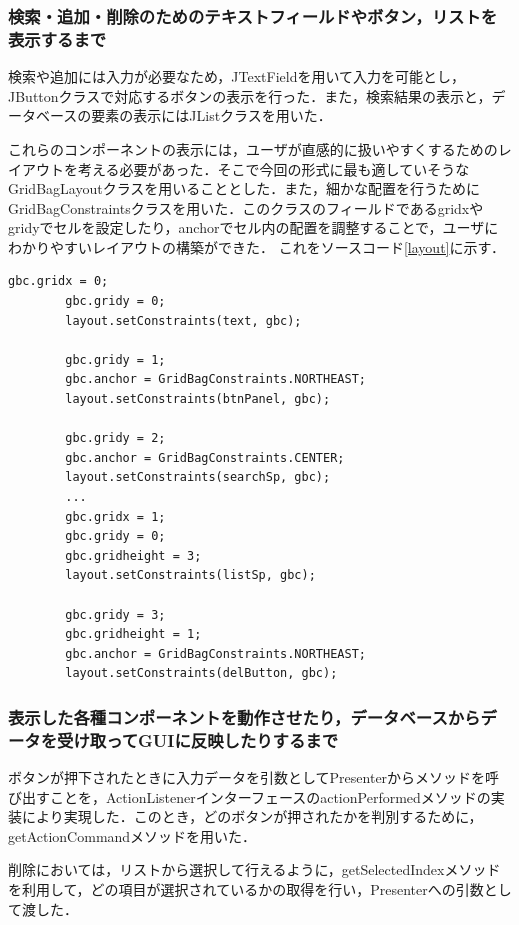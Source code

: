 \documentclass[12pt]{jarticle}
\begin{document}
\subsubsection{検索・追加・削除のためのテキストフィールドやボタン，リストを表示するまで}
検索や追加には入力が必要なため，JTextFieldを用いて入力を可能とし，JButtonクラスで対応するボタンの表示を行った．また，検索結果の表示と，データベースの要素の表示にはJListクラスを用いた．

これらのコンポーネントの表示には，ユーザが直感的に扱いやすくするためのレイアウトを考える必要があった．そこで今回の形式に最も適していそうなGridBagLayoutクラスを用いることとした．また，細かな配置を行うためにGridBagConstraintsクラスを用いた．このクラスのフィールドであるgridxやgridyでセルを設定したり，anchorでセル内の配置を調整することで，ユーザにわかりやすいレイアウトの構築ができた．
これをソースコード\ref{layout}に示す．

\begin{lstlisting}[caption=UnifyGUIコンストラクタの一部, label=layout]
        gbc.gridx = 0;
        gbc.gridy = 0;
        layout.setConstraints(text, gbc);

        gbc.gridy = 1;
        gbc.anchor = GridBagConstraints.NORTHEAST;
        layout.setConstraints(btnPanel, gbc);

        gbc.gridy = 2;
        gbc.anchor = GridBagConstraints.CENTER;
        layout.setConstraints(searchSp, gbc);
        ...
        gbc.gridx = 1;
        gbc.gridy = 0;
        gbc.gridheight = 3;
        layout.setConstraints(listSp, gbc);

        gbc.gridy = 3;
        gbc.gridheight = 1;
        gbc.anchor = GridBagConstraints.NORTHEAST;
        layout.setConstraints(delButton, gbc);
\end{lstlisting}

\subsubsection{表示した各種コンポーネントを動作させたり，データベースからデータを受け取ってGUIに反映したりするまで}
ボタンが押下されたときに入力データを引数としてPresenterからメソッドを呼び出すことを，ActionListenerインターフェースのactionPerformedメソッドの実装により実現した．このとき，どのボタンが押されたかを判別するために，getActionCommandメソッドを用いた．

削除においては，リストから選択して行えるように，getSelectedIndexメソッドを利用して，どの項目が選択されているかの取得を行い，Presenterへの引数として渡した．
\end{document}
